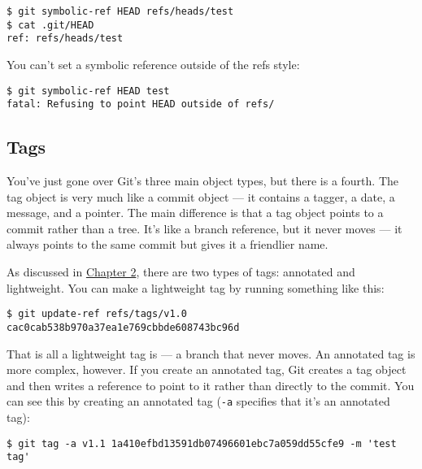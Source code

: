 \documentclass[a4paper]{book}
\newcommand{\prechap}{Chapter }
\newcommand{\postchap}{}
\newcommand{\chapref}[1]{\hyperref[chap:#1]{\prechap #1\postchap}}
\begin{document}
\begin{shaded}\begin{verbatim}
$ git symbolic-ref HEAD refs/heads/test
$ cat .git/HEAD
ref: refs/heads/test
\end{verbatim}\end{shaded}

You can't set a symbolic reference outside of the refs style:

\begin{shaded}\begin{verbatim}
$ git symbolic-ref HEAD test
fatal: Refusing to point HEAD outside of refs/
\end{verbatim}\end{shaded}

\subsection{Tags}

You've just gone over Git's three main object types, but there is a fourth. The tag object is very much like a commit object --- it contains a tagger, a date, a message, and a pointer. The main difference is that a tag object points to a commit rather than a tree. It's like a branch reference, but it never moves --- it always points to the same commit but gives it a friendlier name.

As discussed in \chapref{2}, there are two types of tags: annotated and lightweight. You can make a lightweight tag by running something like this:

\begin{shaded}\begin{verbatim}
$ git update-ref refs/tags/v1.0 cac0cab538b970a37ea1e769cbbde608743bc96d
\end{verbatim}\end{shaded}

That is all a lightweight tag is --- a branch that never moves. An annotated tag is more complex, however. If you create an annotated tag, Git creates a tag object and then writes a reference to point to it rather than directly to the commit. You can see this by creating an annotated tag (\texttt{-a} specifies that it's an annotated tag):

\begin{shaded}\begin{verbatim}
$ git tag -a v1.1 1a410efbd13591db07496601ebc7a059dd55cfe9 -m 'test tag'
\end{verbatim}\end{shaded}
\end{document}
